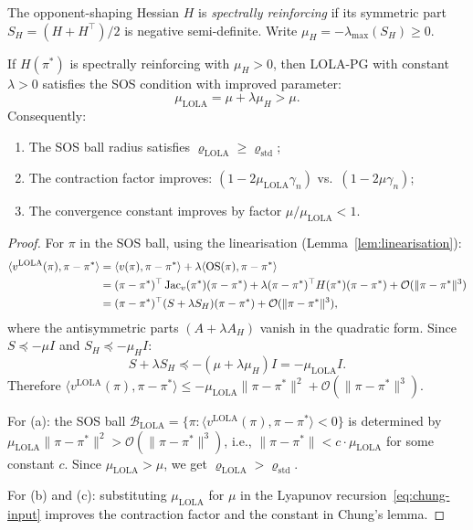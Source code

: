 \begin{definition}
\label{def:spectral-ch3}
The opponent-shaping Hessian $H$ is \emph{spectrally reinforcing} if its symmetric part $S_H = (H + H^\top)/2$ is negative semi-definite. Write $\mu_H = -\lambda_{\max}(S_H) \geq 0$.
\end{definition}

\begin{theorem}
\label{thm:basin-ch3}
If $H(\pi^*)$ is spectrally reinforcing with $\mu_H > 0$, then LOLA-PG with constant $\lambda > 0$ satisfies the SOS condition with improved parameter:
\begin{equation}
\label{eq:mu-lola-ch3}
\boxed{
    \mu_{\mathrm{LOLA}} = \mu + \lambda \mu_H > \mu.
}
\end{equation}
Consequently:
\begin{enumerate}[label=(\alph*)]
    \item The SOS ball radius satisfies $\varrho_{\mathrm{LOLA}} \geq \varrho_{\mathrm{std}}$;
    \item The contraction factor improves: $(1 - 2\mu_{\mathrm{LOLA}} \gamma_n)$ vs.\ $(1 - 2\mu \gamma_n)$;
    \item The convergence constant improves by factor $\mu / \mu_{\mathrm{LOLA}} < 1$.
\end{enumerate}
\end{theorem}

\begin{proof}
For $\pi$ in the SOS ball, using the linearisation (Lemma~\ref{lem:linearisation}):
\begin{align}
    \langle v^{\mathrm{LOLA}}(\pi), \pi - \pi^* \rangle &= \langle v(\pi), \pi - \pi^* \rangle + \lambda \langle \mathrm{OS}(\pi), \pi - \pi^* \rangle \notag \\
    &= (\pi - \pi^*)^\top \operatorname{Jac}_v(\pi^*)(\pi - \pi^*) + \lambda (\pi - \pi^*)^\top H(\pi^*)(\pi - \pi^*) + \mathcal{O}(\|\pi - \pi^*\|^3) \notag \\
    &= (\pi - \pi^*)^\top (S + \lambda S_H)(\pi - \pi^*) + \mathcal{O}(\|\pi - \pi^*\|^3), \label{eq:lola-contraction}
\end{align}
where the antisymmetric parts $(A + \lambda A_H)$ vanish in the quadratic form. Since $S \preceq -\mu I$ and $S_H \preceq -\mu_H I$:
\[
    S + \lambda S_H \preceq -(\mu + \lambda \mu_H) I = -\mu_{\mathrm{LOLA}} I.
\]
Therefore $\langle v^{\mathrm{LOLA}}(\pi), \pi - \pi^* \rangle \leq -\mu_{\mathrm{LOLA}} \|\pi - \pi^*\|^2 + \mathcal{O}(\|\pi - \pi^*\|^3)$.

For (a): the SOS ball $\mathcal{B}_{\mathrm{LOLA}} = \{\pi : \langle v^{\mathrm{LOLA}}(\pi), \pi - \pi^* \rangle < 0\}$ is determined by $\mu_{\mathrm{LOLA}} \|\pi - \pi^*\|^2 > \mathcal{O}(\|\pi - \pi^*\|^3)$, i.e., $\|\pi - \pi^*\| < c \cdot \mu_{\mathrm{LOLA}}$ for some constant $c$. Since $\mu_{\mathrm{LOLA}} > \mu$, we get $\varrho_{\mathrm{LOLA}} > \varrho_{\mathrm{std}}$.

For (b) and (c): substituting $\mu_{\mathrm{LOLA}}$ for $\mu$ in the Lyapunov recursion~\eqref{eq:chung-input} improves the contraction factor and the constant in Chung's lemma.
\end{proof}


